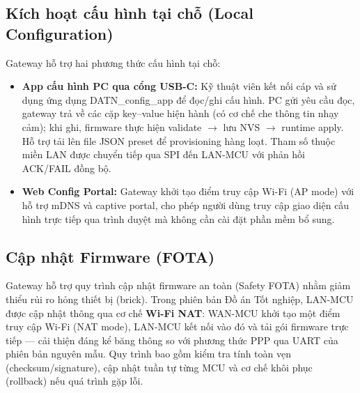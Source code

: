     \subsection{Kích hoạt cấu hình tại chỗ (Local Configuration)}

    Gateway hỗ trợ hai phương thức cấu hình tại chỗ:

    \begin{itemize}
        \item \textbf{App cấu hình PC qua cổng USB-C:} Kỹ thuật viên kết nối cáp và sử dụng ứng dụng DATN\_config\_app để đọc/ghi cấu hình. PC gửi yêu cầu đọc, gateway trả về các cặp key–value hiện hành (có cơ chế che thông tin nhạy cảm); khi ghi, firmware thực hiện validate $\to$ lưu NVS $\to$ runtime apply. Hỗ trợ tải lên file JSON preset để provisioning hàng loạt. Tham số thuộc miền LAN được chuyển tiếp qua SPI đến LAN-MCU với phản hồi ACK/FAIL đồng bộ.
        \item \textbf{Web Config Portal:} Gateway khởi tạo điểm truy cập Wi-Fi (AP mode) với hỗ trợ mDNS và captive portal, cho phép người dùng truy cập giao diện cấu hình trực tiếp qua trình duyệt mà không cần cài đặt phần mềm bổ sung.
    \end{itemize}

    \subsection{Cập nhật Firmware (FOTA)}

    Gateway hỗ trợ quy trình cập nhật firmware an toàn (Safety FOTA) nhằm giảm thiểu rủi ro hỏng thiết bị (brick). Trong phiên bản Đồ án Tốt nghiệp, LAN-MCU được cập nhật thông qua cơ chế \textbf{Wi-Fi NAT}: WAN-MCU khởi tạo một điểm truy cập Wi-Fi (NAT mode), LAN-MCU kết nối vào đó và tải gói firmware trực tiếp — cải thiện đáng kể băng thông so với phương thức PPP qua UART của phiên bản nguyên mẫu. Quy trình bao gồm kiểm tra tính toàn vẹn (checksum/signature), cập nhật tuần tự từng MCU và cơ chế khôi phục (rollback) nếu quá trình gặp lỗi.
